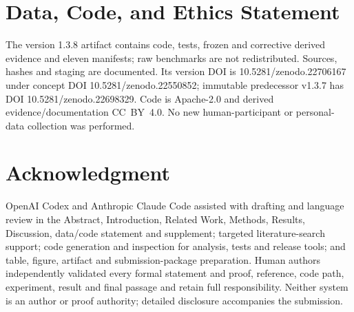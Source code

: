 \documentclass[10pt,journal,compsoc]{IEEEtran}
\begin{document}
\section*{Data, Code, and Ethics Statement}

The version 1.3.8 artifact contains code, tests, frozen and corrective derived evidence and eleven manifests;
raw benchmarks are not redistributed. Sources, hashes and staging are
documented. Its version DOI is 10.5281/zenodo.22706167 under concept DOI
10.5281/zenodo.22550852; immutable predecessor v1.3.7 has DOI
10.5281/zenodo.22698329.
Code is Apache-2.0 and derived evidence/documentation
CC~BY~4.0. No new human-participant or personal-data collection was performed.

\section*{Acknowledgment}

OpenAI Codex and Anthropic Claude Code assisted with drafting and language
review in the Abstract, Introduction, Related Work, Methods, Results,
Discussion, data/code statement and supplement; targeted literature-search
support; code generation and inspection for analysis, tests and release tools;
and table, figure, artifact and submission-package preparation. Human authors
independently validated every formal statement and proof, reference, code path,
experiment, result and final passage and retain full responsibility. Neither
system is an author or proof authority; detailed disclosure accompanies the
submission.


{\sloppy}
\end{document}
